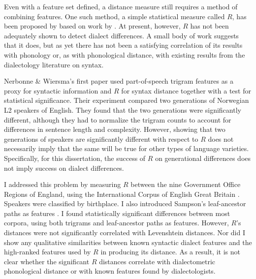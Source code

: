 Even with a feature set defined, a distance measure still requires a
method of combining features. One such method, a simple statistical
measure called $R$, has been proposed by  based
on work by . At present, however, $R$ has not been
adequately shown to detect dialect differences. A small body of work
suggests that it does, but as yet there has not been a satisfying
correlation of its results with phonology or, as with phonological
distance, with existing results from the dialectology literature on
syntax.

Nerbonne \& Wiersma's first paper used part-of-speech trigram features
as a proxy for syntactic information and $R$ for syntax distance
together with a test for statistical significance\cite{nerbonne06}.
Their experiment compared two generations of Norwegian L2 speakers of
English.  They found that the two generations were significantly
different, although they had to normalize the trigram counts to
account for differences in sentence length and complexity. However,
showing that two generations of speakers are significantly different
with respect to $R$ does not necessarily imply that the same will be
true for other types of language varieties. Specifically, for this
dissertation, the success of $R$ on generational differences does not
imply success on dialect differences.

I addressed this problem \cite{sanders08b} by measuring $R$ between
the nine Government Office Regions of England, using the International
Corpus of English Great Britain \cite{nelson02}. Speakers were classified by
birthplace. I also introduced Sampson's leaf-ancestor paths as
features \cite{sampson00}. I found statistically
significant differences between most corpora, using both trigrams and
leaf-ancestor paths as features. However, $R$'s distances were not
significantly correlated with Levenshtein distances. Nor did I
show any qualitative similarities between known syntactic dialect
features and the high-ranked features used by $R$ in producing its
distance. As a result, it is not clear whether the significant $R$ distances
correlate with dialectometric phonological distance or with known
features found by dialectologists.


